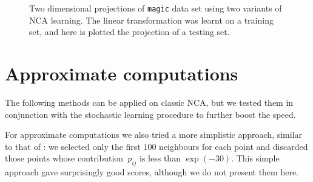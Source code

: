      \begin{figure}
		 \centering
			    \hspace{0.02\textwidth}
		\caption[Two dimensional projections of \texttt{magic} data set using two variants of NCA learning: mini-batches and stochastic learning]{Two dimensional projections of \texttt{magic} data set using two variants of NCA learning. The linear transformation was learnt on a training set, and here is plotted the projection of a testing set.}
		\label{fig:magic-projection}
	\end{figure}

\section{Approximate computations}
\label{sec:eval-nca-approx}

The following methods can be applied on classic NCA, but we tested them in conjunction with the stochastic learning procedure to further boost the speed. 

For approximate computations we also tried a more simplistic approach, similar to that of \citet{weinberger2007}: we selected only the first $100$ neighbours for each point and discarded those points whose contribution~$p_{ij}$ is less than $\exp(-30)$. This simple approach gave surprisingly good scores, although we do not present them here.

